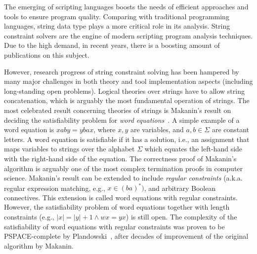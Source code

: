 
The emerging of scripting languages boosts the needs of efficient approaches and tools to ensure program quality.
Comparing with traditional programming languages, string data type plays a more critical role in its analysis.
String constraint solvers are the engine of modern scripting program analysis techniques. 
Due to the high demand, in recent years, there is a boosting amount of publications on this subject.

However, research progress of string constraint solving has been hampered by many major challenges in both theory and tool implementation aspects (including long-standing open problems). 
Logical theories over strings have to allow string concatenation, which is arguably the most fundamental operation of strings. 
The most celebrated result concerning theories of strings is Makanin’s result on deciding the satisfiability problem for \emph{word equations}~\cite{makanin77}.
A simple example of a word equation is $xaby = ybax$, where $x, y$ are variables, and $a, b \in \Sigma$ are constant letters. 
A word equation is satisfiable if it has a solution, i.e., an assignment that maps variables to strings over the alphabet $\Sigma$ which equates the left-hand side with the right-hand side of the equation.
The correctness proof of Makanin’s algorithm is arguably one of the most complex termination proofs in computer science. 
Makanin’s result can be extended to include \emph{regular constraints} (a.k.a. regular expression matching, e.g., $x \in (ba)^*)$, and arbitrary Boolean connectives.
This extension is called word equations with regular constraints. 
However, the satisfiability problem of word equations together with length constraints (e.g., $\vert x\vert =\vert y\vert +1 \wedge wx=yx$) is still open.
The complexity of the satisfiability of word equations with regular constraints was proven to be PSPACE-complete by Plandowski~\cite{plandowski99}, after decades of improvement of the original algorithm by Makanin.

